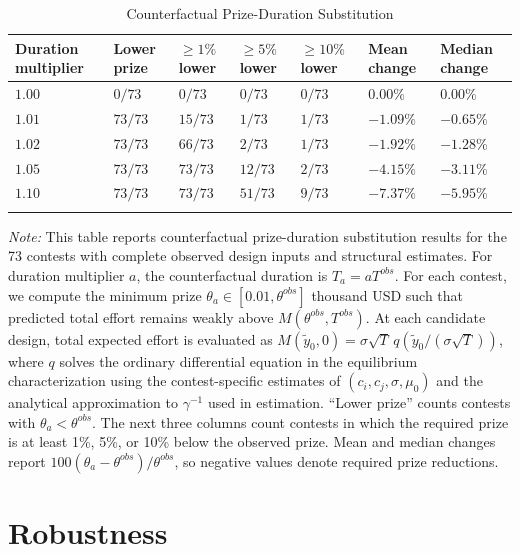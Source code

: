 \documentclass[mnsc]{informs3}
\begin{document}
\begin{table}[htbp]
\centering
\caption{Counterfactual Prize-Duration Substitution}
\label{tab-counterfactual-policy}
\scriptsize
\begin{tabularx}{\textwidth}{lYYYYYY}
\toprule
\textbf{Duration multiplier} & \textbf{Lower prize} & \textbf{$\geq1\%$ lower} & \textbf{$\geq5\%$ lower} & \textbf{$\geq10\%$ lower} & \textbf{Mean change} & \textbf{Median change} \\
\midrule
$1.00$ & $0/73$ & $0/73$ & $0/73$ & $0/73$ & $0.00\%$ & $0.00\%$ \\
$1.01$ & $73/73$ & $15/73$ & $1/73$ & $1/73$ & $-1.09\%$ & $-0.65\%$ \\
$1.02$ & $73/73$ & $66/73$ & $2/73$ & $1/73$ & $-1.92\%$ & $-1.28\%$ \\
$1.05$ & $73/73$ & $73/73$ & $12/73$ & $2/73$ & $-4.15\%$ & $-3.11\%$ \\
$1.10$ & $73/73$ & $73/73$ & $51/73$ & $9/73$ & $-7.37\%$ & $-5.95\%$ \\
\bottomrule
\addlinespace[0.5ex]
\end{tabularx}
\begin{minipage}{\textwidth}
{\footnotesize
\textit{Note:}
This table reports counterfactual prize-duration substitution results for the 73 contests with complete observed design inputs and structural estimates.
For duration multiplier $a$, the counterfactual duration is $T_a=aT^{obs}$.
For each contest, we compute the minimum prize $\theta_a\in[0.01,\theta^{obs}]$ thousand USD such that predicted total effort remains weakly above $M(\theta^{obs},T^{obs})$. At each candidate design, total expected effort is evaluated as $M(\tilde y_0,0)=\sigma\sqrt{T}\,q(\tilde y_0/(\sigma\sqrt{T}))$, where $q$ solves the ordinary differential equation in the equilibrium characterization using the contest-specific estimates of $(c_i,c_j,\sigma,\mu_0)$ and the analytical approximation to $\gamma^{-1}$ used in estimation.
``Lower prize'' counts contests with $\theta_a<\theta^{obs}$.
The next three columns count contests in which the required prize is at least 1\%, 5\%, or 10\% below the observed prize.
Mean and median changes report $100(\theta_a-\theta^{obs})/\theta^{obs}$, so negative values denote required prize reductions.
}
\end{minipage}
\end{table}





\section{Robustness}
\end{document}
